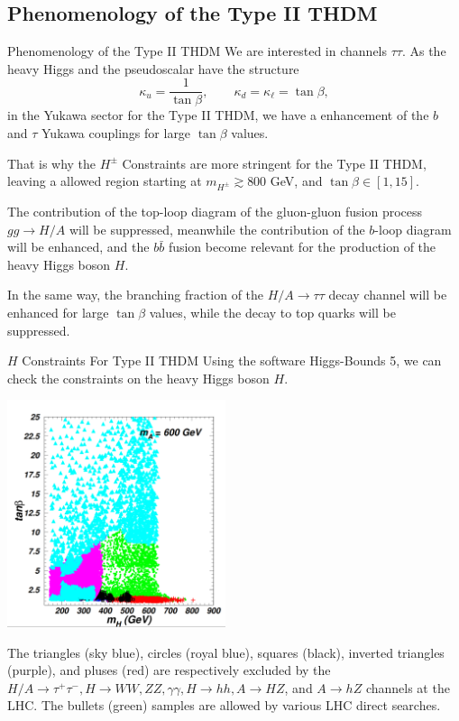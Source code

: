 \documentclass{../bredelebeamer}
\begin{document}
\subsection{Phenomenology of the Type II THDM}
\begin{frame}{Phenomenology of the Type II THDM}
    We are interested in channels $\tau \tau$. As the heavy Higgs and the pseudoscalar have the structure
    $$
    \kappa_u=\frac{1}{\tan\beta}, \qquad \kappa_d=\kappa_\ell=\tan\beta,
    $$
    in the Yukawa sector for the Type II THDM, we have a enhancement of the $b$ and $\tau$ Yukawa couplings for large $\tan\beta$ values.\vfill

    That is why the {$H^\pm$ Constraints} are more stringent for the Type II THDM, leaving a allowed region starting at $m_{H^\pm} \gtrsim 800$ GeV, and $\tan\beta \in [1, 15]$.\vfill

    The contribution of the top-loop diagram of the gluon-gluon fusion process $gg \rightarrow H / A$ will be suppressed, meanwhile the contribution of the $b$-loop diagram will be enhanced, and the $b\bar b$ fusion become relevant for the production of the heavy Higgs boson $H$. 
    \vfill

    In the same way, the branching fraction of the $H/A \rightarrow \tau \tau$ decay channel will be enhanced for large $\tan\beta$ values, while the decay to top quarks will be suppressed.
\end{frame}

\begin{frame}{$H$ Constraints For Type II THDM}
    Using the software Higgs-Bounds 5, we can check the constraints on the heavy Higgs boson $H$. 
    \begin{center}
        \includegraphics[width=0.48\textwidth]{HH_Constraints.png}
    \end{center}
    The triangles (sky blue), circles (royal blue), squares (black), inverted triangles (purple), and pluses (red) are respectively excluded by the $H / A \rightarrow \tau^{+} \tau^{-}, H \rightarrow W W, Z Z, \gamma \gamma, H \rightarrow h h, A \rightarrow H Z$, and $A \rightarrow h Z$ channels at the LHC. The bullets (green) samples are allowed by various LHC direct searches.
\end{frame}
\end{document}
